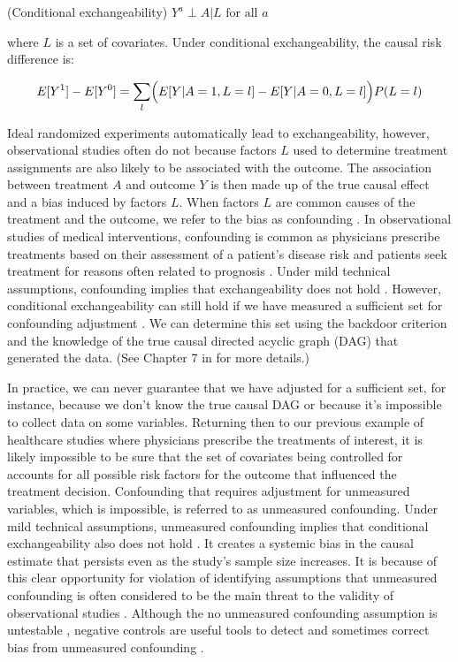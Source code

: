 \begin{assumption} (Conditional exchangeability) \label{as:conditional-exchangeability}
  $Y^{a} \perp A | L \text{ for all } a$
\end{assumption}

\noindent where $L$ is a set of covariates. Under conditional exchangeability, the causal risk difference is:

\begin{equation}
E[Y^{1}] - E[Y^{0}] = \sum_{l} \Bigl( E[Y | A = 1, L = l] - E[Y | A = 0, L = l] \Bigr) P(L = l)
\end{equation}

Ideal randomized experiments automatically lead to exchangeability, however, observational studies often do not because factors $L$ used to determine treatment assignments are also likely to be associated with the outcome. The association between treatment $A$ and outcome $Y$ is then made up of the true causal effect and a bias induced by factors $L$. When factors $L$ are common causes of the treatment and the outcome, we refer to the bias as confounding \cite{hernan2010causal}. In observational studies of medical interventions, confounding is common as physicians prescribe treatments based on their assessment of a patient’s disease risk and patients seek treatment for reasons often related to prognosis \cite{brookhart2010confounding}. Under mild technical assumptions, confounding implies that exchangeability does not hold \cite{hernan2010causal}. However, conditional exchangeability can still hold if we have measured a sufficient set for confounding adjustment \cite{hernan2010causal}. We can determine this set using the backdoor criterion \cite{pearl1995causal} and the knowledge of the true causal directed acyclic graph (DAG) that generated the data. (See Chapter 7 in \cite{hernan2010causal} for more details.)

In practice, we can never guarantee that we have adjusted for a sufficient set, for instance, because we don't know the true causal DAG or because it's impossible to collect data on some variables.
Returning then to our previous example of healthcare studies where physicians prescribe the treatments of interest, it is likely impossible to be sure that the set of covariates being controlled for accounts for all possible risk factors for the outcome that influenced the treatment decision. Confounding that requires adjustment for unmeasured variables, which is impossible, is referred to as unmeasured confounding. Under mild technical assumptions, unmeasured confounding implies that conditional exchangeability also does not hold \cite{hernan2010causal}. It creates a systemic bias in the causal estimate that persists even as the study's sample size increases.
It is because of this clear opportunity for violation of identifying assumptions that unmeasured confounding is often considered to be the main threat to the validity of observational studies \cite{fewell2007impact}.
Although the no unmeasured confounding assumption is untestable \cite{shi2020selective}, negative controls are useful tools to detect and sometimes correct bias from unmeasured confounding \cite{lipsitch2010negative}.

